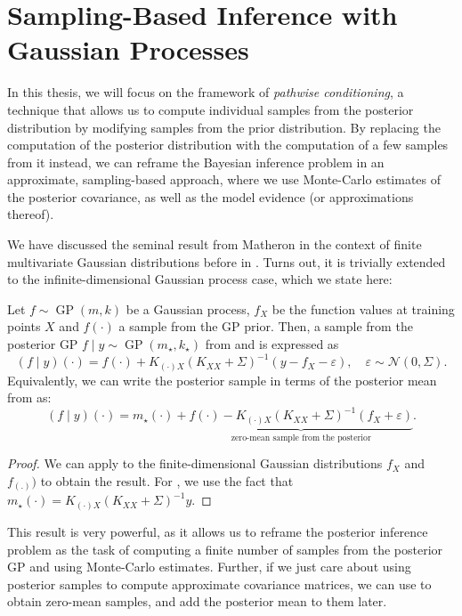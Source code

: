 \section{Sampling-Based Inference with Gaussian Processes}

In this thesis, we will focus on the framework of \emph{pathwise conditioning}, a technique that allows us to compute individual samples from the posterior distribution by modifying samples from the prior distribution. By replacing the computation of the posterior distribution with the computation of a few samples from it instead, we can reframe the Bayesian inference problem in an approximate, sampling-based approach, where we use Monte-Carlo estimates of the posterior covariance, as well as the model evidence (or approximations thereof). 

We have discussed the seminal result from Matheron \parencite{journel1976mining, chiles2012geostatistics, wilson2021pathwise} in the context of finite multivariate Gaussian distributions before in . Turns out, it is trivially extended to the infinite-dimensional Gaussian process case, which we state here:\label{ntn:prior_sample}\label{ntn:posterior_sample}\label{ntn:likelihood_noise}
\begin{theorem}
    \label{thm:matherons_rule_gp}
Let $f \sim \operatorname{GP}(m, k)$ be a Gaussian process, $f_X$ be the function values at training points $X$ and $f(\cdot)$ a sample from the GP prior. Then, a sample from the posterior GP $f \mid y \sim \operatorname{GP}(m_{\star}, k_{\star})$ from  and  is expressed as
\[
    (f \mid y)(\cdot) = f(\cdot) + K_{(\cdot)X} (K_{XX} + \Sigma)^{-1} (y - f_X - \varepsilon), \quad \varepsilon \sim \mathcal{N}(0, \Sigma). \label{eq:pathwise_conditioning_gp}
\]
Equivalently, we can write the posterior sample in terms of the posterior mean from  as:
\[
 (f \mid y)(\cdot) = m_{\star}(\cdot) + \underbrace{f(\cdot) - K_{(\cdot)X} (K_{XX} + \Sigma)^{-1} (f_X + \varepsilon)}_{\text{zero-mean sample from the posterior}}. \label{eq:pathwise_conditioning_gp_2}
\]
\end{theorem}
\begin{proof}
We can apply  to the finite-dimensional Gaussian distributions $f_X$ and $f_{(.)})$ to obtain the result. For , we use the fact that $m_{\star}(\cdot) = K_{(\cdot)X} (K_{XX} + \Sigma)^{-1} y$.
\end{proof}
This result is very powerful, as it allows us to reframe the posterior inference problem as the task of computing a finite number of samples from the posterior GP and using Monte-Carlo estimates. Further, if we just care about using posterior samples to compute approximate covariance matrices, we can use  to obtain zero-mean samples, and add the posterior mean to them later.

